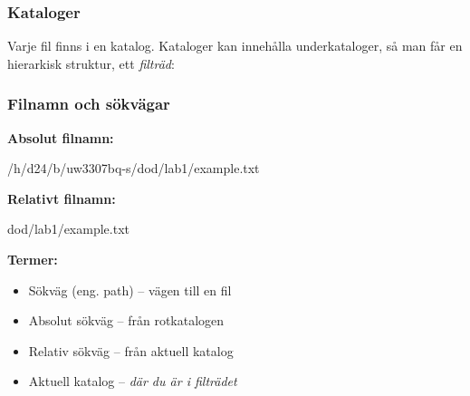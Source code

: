 \begin{frame}[fragile=singleslide]
    \frametitle{Kataloger}
    Varje fil finns i en katalog. Kataloger kan innehålla underkataloger, så man får en hierarkisk struktur, ett \emph{filträd}:

    \begin{center}
        \resizebox{!}{0.7\textheight}{}
    \end{center}

\end{frame}








\begin{frame}[fragile=singleslide]
    \frametitle{Filnamn och sökvägar}

    \textbf{Absolut filnamn:}
    \begin{Code}
        /h/d24/b/uw3307bq-s/dod/lab1/example.txt
    \end{Code}

    \textbf{Relativt filnamn:}
    \begin{Code}
        dod/lab1/example.txt
    \end{Code}

    \textbf{Termer:}
    \begin{itemize}
        \item Sökväg (eng. path) -- vägen till en fil
        \item Absolut sökväg -- från rotkatalogen
        \item Relativ sökväg -- från aktuell katalog
        \item Aktuell katalog -- \emph{där du är i filträdet}
    \end{itemize}

\end{frame}


